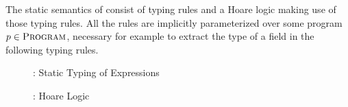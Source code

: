 The static semantics of \svlidf consist of typing rules and a Hoare logic making use of those typing rules.
All the rules are implicitly parameterized over some program $p \in \textup{\textsc{Program}}$, necessary for example to extract the type of a field in the following typing rules.

\begin{figure}[h]
    
    \caption{\svlidf: Static Typing of Expressions}
\end{figure}

\begin{figure}[h!]
    
    \caption{\svlidf: Hoare Logic} 
\end{figure}

\begin{comment}
Let $\wsp : \setStmt \rightarrow \PP(\setProgramState)$ be defined as
\newcommand{\tempDefPS}{\{~ \pi \in \setProgramState_s ~|~ \exists \phi_1, \phi_2 \in \setFormula,\, \Gamma \in \setTypeEnv.~ \thoare{\Gamma}{\phi_1}{s}{\phi_2} ~~\wedge~~ \evalphiGen{\pi}{\phi_1} ~\}}
\begin{flalign*}
& \wsp(s)                 & =~ & \tempDefPS       & ~ \\
& \wsp(s) & =~ &
\begin{cases}
\setProgramState_s                                                                                  & \text{if~} s = \sAlloc{$x$}{$C$}            \\
\{~ \pi \in \setProgramState_s ~|~ \evalphiGen{\pi}{\phiAcc{$x$}{$f$}} ~\}                          & \text{if~} s = \sFieldAssign{$x$}{$f$}{$y$} \\
\{~ \pi \in \setProgramState_s ~|~ \evalphiGen{\pi}{\accFor{$e$}} ~\}                               & \text{if~} s = \sVarAssign{$x$}{$e$}        \\
\setProgramState_s                                                                                  & \text{if~} s = \sReturn{$x$}                \\
\{~ \pi \in \setProgramState_s ~|~ \evalphiGen{\pi}{\phiCons{\phiNeq{$y$}{\enull}}{\mpre{$m$}}} ~\} & \text{if~} s = \sCall{$x$}{$y$}{$m$}{$z$}   \\
\{~ \pi \in \setProgramState_s ~|~ \evalphiGen{\pi}{\phi} ~\}                                       & \text{if~} s = \sAssert{$\phi$}             \\
\{~ \pi \in \setProgramState_s ~|~ \evalphiGen{\pi}{\phi} ~\}                                       & \text{if~} s = \sRelease{$\phi$}
\end{cases}
& ~ \\ 
\end{flalign*}
\end{comment}